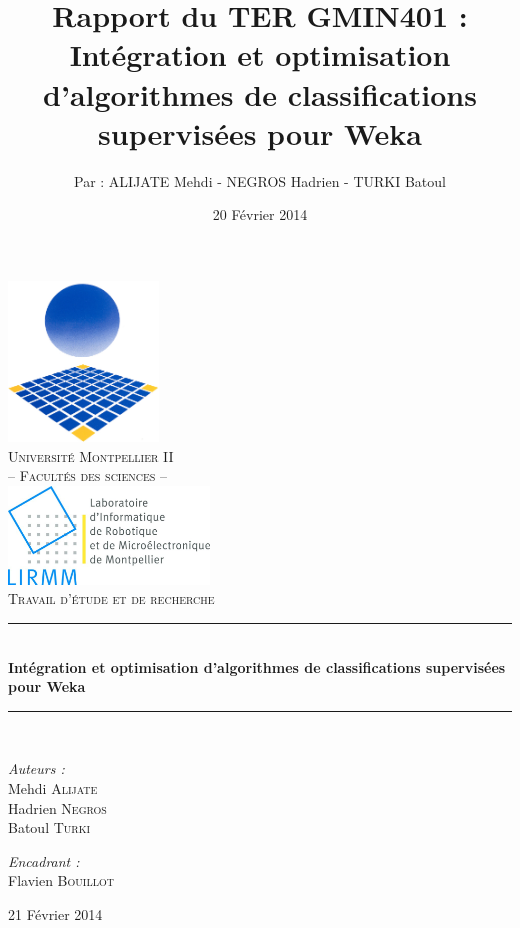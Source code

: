 \documentclass{article}
\title{Rapport du TER GMIN401 :\\ \textbf{Intégration et optimisation d’algorithmes de classifications supervisées pour Weka}}
\author{Par : ALIJATE Mehdi - NEGROS Hadrien - TURKI Batoul}
\date{20 Février 2014}
\newcommand{\HRule}{\rule{\linewidth}{0.5mm}}
\begin{document}
\begin{titlepage}

  \begin{center}

    \includegraphics[width=0.30\textwidth]{logo_um2}~\\[1cm]    

    \textsc{\LARGE Université Montpellier II \\ -- Facultés des sciences --}\\[1.5cm]
       
    \includegraphics[width=0.40\textwidth]{lirmm}~\\[1cm]    
    \textsc{\huge Travail d'étude et de recherche}\\[0.5cm]

    \HRule \\[0.4cm]
    { \huge \bfseries Intégration et optimisation d’algorithmes de classifications supervisées pour Weka}\\[0.4cm]
    \HRule \\[1.5cm]

    \begin{minipage}{0.4\textwidth}
      \begin{flushleft} \large
        \emph{Auteurs :}\\
        Mehdi \textsc{Alijate} \\
        Hadrien \textsc{Negros} \\
        Batoul \textsc{Turki} \\   
      \end{flushleft}
    \end{minipage}
    \begin{minipage}{0.4\textwidth}
      \begin{flushright} \large
        \emph{Encadrant :} \\
        Flavien \textsc{Bouillot} \\
      \end{flushright}
    \end{minipage}
    \vfill

    {\large 21 Février 2014}

  \end{center}

\end{titlepage}
\tableofcontents
\end{document}
